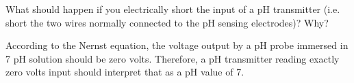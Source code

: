 

What should happen if you electrically short the input of a pH transmitter (i.e. short the two wires normally connected to the pH sensing electrodes)?  Why?







According to the Nernst equation, the voltage output by a pH probe immersed in 7 pH solution should be zero volts.  Therefore, a pH transmitter reading exactly zero volts input should interpret that as a pH value of 7.











